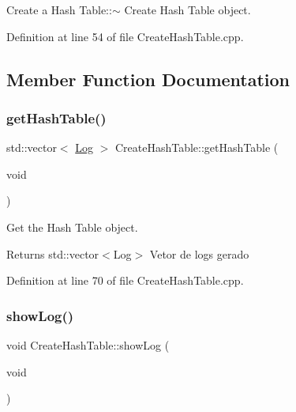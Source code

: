Create a Hash Table\+:\+:$\sim$ Create Hash Table object. 



Definition at line 54 of file Create\+Hash\+Table.\+cpp.



\subsection{Member Function Documentation}
\mbox{\label{class_create_hash_table_a9e01964c0d11a330bfce92c77fad0ca5}} 
\subsubsection{\texorpdfstring{get\+Hash\+Table()}{getHashTable()}}
{\footnotesize\ttfamily std\+::vector$<$ \hyperlink{class_log}{Log} $>$ Create\+Hash\+Table\+::get\+Hash\+Table (\begin{DoxyParamCaption}\item[{void}]{ }\end{DoxyParamCaption})}



Get the Hash Table object. 

\begin{DoxyReturn}{Returns}
std\+::vector$<$\+Log$>$ Vetor de logs gerado 
\end{DoxyReturn}


Definition at line 70 of file Create\+Hash\+Table.\+cpp.

\mbox{\label{class_create_hash_table_ab50343628947f7064f4ab646a834ef03}} 
\subsubsection{\texorpdfstring{show\+Log()}{showLog()}}
{\footnotesize\ttfamily void Create\+Hash\+Table\+::show\+Log (\begin{DoxyParamCaption}\item[{void}]{ }\end{DoxyParamCaption})}



